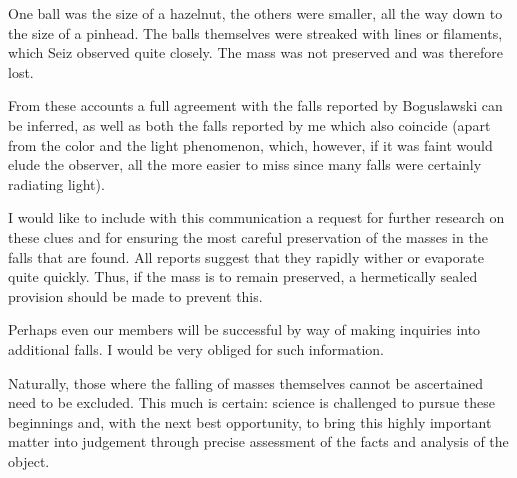 \documentclass[a4paper, 12pt, oneside]{article}
\begin{document}
One ball was the size of a hazelnut, the others were smaller, all the way down to the size of a pinhead. The balls themselves were streaked with lines or filaments, which Seiz observed quite closely. The mass was not preserved and was therefore lost.

From these accounts a full agreement with the falls reported by Boguslawski can be inferred, as well as both the falls reported by me which also coincide (apart from the color and the light phenomenon, which, however, if it was faint would elude the observer, all the more easier to miss since many falls were certainly radiating light).

I would like to include with this communication a request for further research on these clues and for ensuring the most careful preservation of the masses in the falls that are found. All reports suggest that they rapidly wither or evaporate quite quickly. Thus, if the mass is to remain preserved, a hermetically sealed provision should be made to prevent this.

Perhaps even our members will be successful by way of making inquiries into additional falls. I would be very obliged for such information.

Naturally, those where the falling of masses themselves cannot be ascertained need to be excluded. This much is certain: science is challenged to pursue these beginnings and, with the next best opportunity, to bring this highly important matter into judgement through precise assessment of the facts and analysis of the object.
\clearpage
\end{document}
